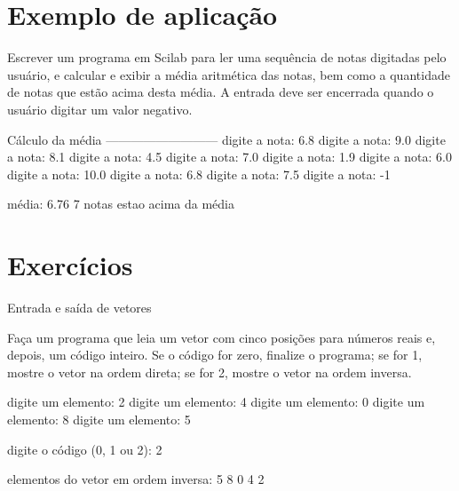 \documentclass[11pt]{practice}
\begin{document}
\newpage

\section{Exemplo de aplicação}

Escrever um programa em Scilab para ler uma sequência de notas digitadas
pelo usuário, e calcular e exibir a média aritmética das notas, bem como
a quantidade de notas que estão acima desta média. A entrada deve ser
encerrada quando o usuário digitar um valor negativo.

\begin{runexample}
Cálculo da média
---------------------------
digite a nota: 6.8
digite a nota: 9.0
digite a nota: 8.1
digite a nota: 4.5
digite a nota: 7.0
digite a nota: 1.9
digite a nota: 6.0
digite a nota: 10.0
digite a nota: 6.8
digite a nota: 7.5
digite a nota: -1

média: 6.76
7 notas estao acima da média
\end{runexample}


\newpage

\section{Exercícios}

\begin{task}{Entrada e saída de vetores}{}

  Faça um programa que leia um vetor com cinco posições para números
  reais e, depois, um código inteiro. Se o código for zero, finalize o
  programa; se for 1, mostre o vetor na ordem direta; se for 2, mostre o
  vetor na ordem inversa.

  \begin{runexample}
digite um elemento: 2
digite um elemento: 4
digite um elemento: 0
digite um elemento: 8
digite um elemento: 5

digite o código (0, 1 ou 2): 2

elementos do vetor em ordem inversa:
5 8 0 4 2
  \end{runexample}

  \tcblower
  \solution
\end{task}
\end{document}

